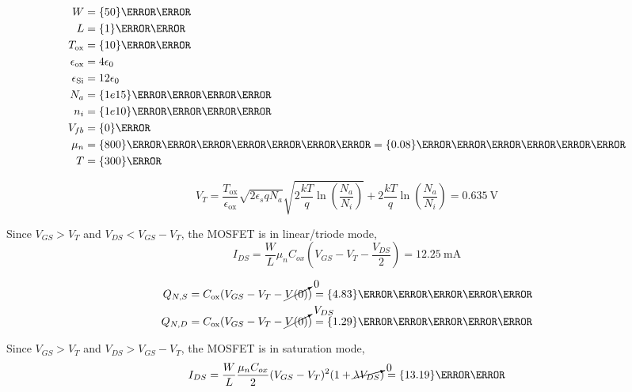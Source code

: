 \documentclass{article}
\begin{document}
\question{}

\begin{align}
  W &= \qty{50}{\micro\meter} \\
  L &= \qty{1}{\micro\meter} \\
  T_{\text{ox}} &= \qty{10}{\nano\meter} \\
  \epsilon_{\text{ox}} &= 4\epsilon_{0} \\
  \epsilon_{\ce{Si}} &= 12\epsilon_{0} \\
  N_{a} &= \qty{1e15}{\per\centi\meter\cubed} \\
  n_{i} &= \qty{1e10}{\per\centi\meter\cubed} \\
  V_{fb} &= \qty{0}{\volt} \\
  \mu_{n} &= \qty{800}{\centi\meter\squared\per\volt\per\second} = \qty{0.08}{\meter\squared\per\volt\per\second} \\
  T &= \qty{300}{\kelvin}
\end{align}

\begin{subparts}
  \item
  \begin{equation}
      V_{T} = \frac{T_{\text{ox}}}{\epsilon_{\text{ox}}} \sqrt{2 \epsilon_{s} q N_{a}} \sqrt{2 \frac{kT}{q} \ln\left(\frac{N_{a}}{N_{i}}\right)} + 2 \frac{kT}{q} \ln\left(\frac{N_{a}}{N_{i}}\right) = \qty{0.635}{\volt}
  \end{equation}
  \item
  Since \(V_{GS} > V_{T}\) and \(V_{DS} < V_{GS} - V_{T}\), the MOSFET is in linear/triode mode,
  \begin{equation}
    I_{DS} = \frac{W}{L} \mu_{n} C_{ox} \left(V_{GS} - V_{T} - \frac{V_{DS}}{2}\right) = \qty{12.25}{\milli\ampere}
  \end{equation}
  \item
  \begin{align}
    Q_{N, S} &= C_{\text{ox}} (V_{GS} - V_{T} - \cancelto{0}{V(0)}) = \qty{4.83}{\milli\coulomb\per\meter\squared} \\
    Q_{N, D} &= C_{\text{ox}} (V_{GS} - V_{T} - \cancelto{V_{DS}}{V(0)}) = \qty{1.29}{\milli\coulomb\per\meter\squared} \\
  \end{align}
  \item
  Since \(V_{GS} > V_{T}\) and \(V_{DS} > V_{GS} - V_{T}\), the MOSFET is in saturation mode,
  \begin{equation}
    I_{DS} = \frac{W}{L} \frac{\mu_{n} C_{ox}}{2} (V_{GS} - V_{T})^{2} (1 + \cancelto{0}{\lambda V_{DS}}) = \qty{13.19}{\milli\ampere}
  \end{equation}
\end{subparts}
\end{document}
